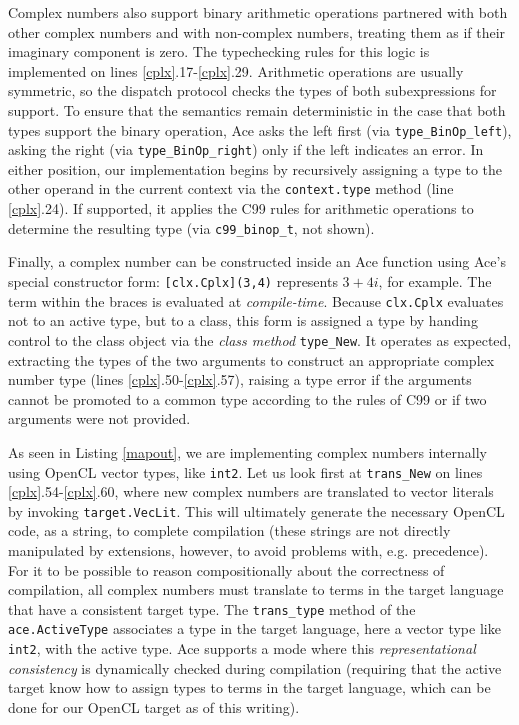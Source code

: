 \documentclass[10pt,preprint]{sigplanconf}
\begin{document}
{Complex numbers also support binary arithmetic operations partnered with both other complex numbers and with non-complex numbers, treating them as if their imaginary component is zero. The typechecking rules for this logic is implemented on lines \ref{cplx}.17-\ref{cplx}.29. Arithmetic operations are usually symmetric, so the dispatch protocol checks the types of both subexpressions for support. To ensure that the semantics remain deterministic in the case that both types support the binary operation, Ace asks the left first (via \verb|type_BinOp_left|), asking the right (via \verb|type_BinOp_right|) only if the left indicates an error. In either position, our implementation begins by recursively assigning a type to the other operand in the current context via the \verb|context.type| method (line \ref{cplx}.24). If supported, it applies the C99 rules for arithmetic operations to determine the resulting type (via \verb|c99_binop_t|, not shown). 

Finally, a complex number can be constructed inside an Ace function using Ace's special constructor form: \verb|[clx.Cplx](3,4)| represents $3+4i$, for example. The term within the braces is evaluated at \emph{compile-time}. Because \verb|clx.Cplx| evaluates not to an active type, but to a class, this form is assigned a type by handing control to the class object via the \emph{class method} \verb|type_New|. It operates as expected, extracting the types of the two arguments to construct an appropriate complex number type (lines \ref{cplx}.50-\ref{cplx}.57), raising a type error if the arguments cannot be promoted to a common type according to the rules of C99 or if two arguments were not provided.%

As seen in Listing \ref{mapout}, we are implementing complex numbers internally using OpenCL vector types, like \verb|int2|. Let us look first at \verb|trans_New| on lines \ref{cplx}.54-\ref{cplx}.60, where new complex numbers are translated to vector literals by invoking \verb|target.VecLit|. This will ultimately  generate the necessary OpenCL code, as a string, to complete compilation (these strings are not directly manipulated by extensions, however, to avoid problems with, e.g. precedence). For it to be possible to reason compositionally about the correctness of compilation, all complex numbers must translate to terms in the target language that have a consistent target type. The \verb|trans_type| method of the \verb|ace.ActiveType| associates a type in the target language, here a vector type like \verb|int2|, with the active type. Ace supports a mode where this \emph{representational consistency} is dynamically checked during compilation (requiring that the active target know how to assign types to terms in the target language, which can be done  for our OpenCL target as of this writing).

}
\end{document}
